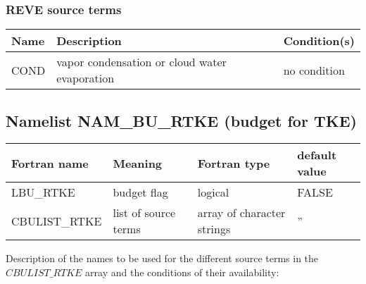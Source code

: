 \subsubsection{REVE source terms}

\begin{longtable} {|p{}|p{}|p{}|}
\hline
Name & Description & Condition(s) \\
\hline \hline
\endhead
COND   & vapor condensation or cloud water evaporation & no condition \\\hline
\end{longtable}


\subsection{Namelist NAM\_BU\_RTKE (budget for TKE)}

\begin{longtable} {|p{}|p{}|>{\centering}p{}|p{}<{\centering}|}
\hline
Fortran name & Meaning & Fortran type & default value \\
\hline \hline
\endhead
LBU\_RTKE & budget flag & logical & FALSE\index{LBU\_RTKE!\innam{NAM\_BU\_RTKE}} \\\hline
CBULIST\_RTKE & list of source terms & array of character strings & ''\index{CBULIST\_RTKE!\innam{NAM\_BU\_RTKE}} \\\hline
\end{longtable}

Description of the names to be used for the different source terms in the $CBULIST\_RTKE$ array and the conditions of their availability:

